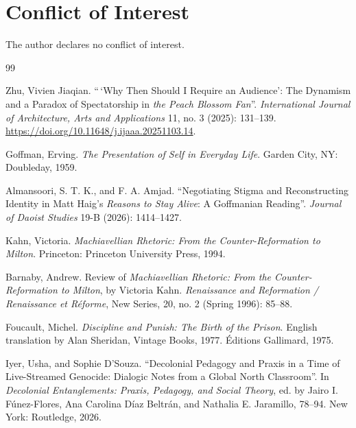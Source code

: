\documentclass[10pt]{article}
\begin{document}
\newpage
\section*{Conflict of Interest}
The author declares no conflict of interest.

\begin{thebibliography}{99}
\setlength{\itemsep}{0.6em}

 Zhu, Vivien Jiaqian. ``\,`Why Then Should I Require an Audience': The Dynamism and a Paradox of Spectatorship in \emph{the Peach Blossom Fan}''. \emph{International Journal of Architecture, Arts and Applications} 11, no. 3 (2025): 131--139. \url{https://doi.org/10.11648/j.ijaaa.20251103.14}.

 Goffman, Erving. \emph{The Presentation of Self in Everyday Life}. Garden City, NY: Doubleday, 1959.

 Almansoori, S. T. K., and F. A. Amjad. ``Negotiating Stigma and Reconstructing Identity in Matt Haig's \emph{Reasons to Stay Alive}: A Goffmanian Reading''. \emph{Journal of Daoist Studies} 19-B (2026): 1414--1427.

 Kahn, Victoria. \emph{Machiavellian Rhetoric: From the Counter-Reformation to Milton}. Princeton: Princeton University Press, 1994.

 Barnaby, Andrew. Review of \emph{Machiavellian Rhetoric: From the Counter-Reformation to Milton}, by Victoria Kahn. \emph{Renaissance and Reformation / Renaissance et R\'eforme}, New Series, 20, no. 2 (Spring 1996): 85--88.

 Foucault, Michel. \emph{Discipline and Punish: The Birth of the Prison}. English translation by Alan Sheridan, Vintage Books, 1977. \'Editions Gallimard, 1975.

 Iyer, Usha, and Sophie D'Souza. ``Decolonial Pedagogy and Praxis in a Time of Live-Streamed Genocide: Dialogic Notes from a Global North Classroom''. In \emph{Decolonial Entanglements: Praxis, Pedagogy, and Social Theory}, ed. by Jairo I. F\'unez-Flores, Ana Carolina D\'iaz Beltr\'an, and Nathalia E. Jaramillo, 78--94. New York: Routledge, 2026.


\end{thebibliography}
\end{document}
